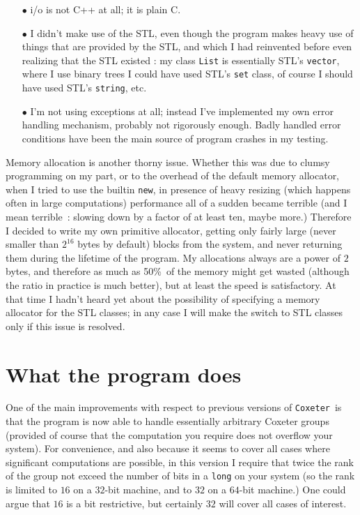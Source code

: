 \documentclass[11pt]{article}
\newcommand{\coxeter}{{\tt Coxeter}}
\begin{document}
\begin{itemize} pt
\item[$\bullet$]i/o is not C++ at all; it is plain C.
\item[$\bullet$]I didn't make use of the STL, even though the program makes
heavy use of things that are provided by the STL, and which I had reinvented
before even realizing that the STL existed : my class {\tt List} is
essentially STL's {\tt vector}, where I use binary trees I could have used
STL's {\tt set} class, of course I should have used STL's {\tt string}, etc.
\item[$\bullet$]I'm not using exceptions at all; instead I've implemented
my own error handling mechanism, probably not rigorously enough. Badly
handled error conditions have been the main source of program crashes in
my testing.
\end{itemize}

\noindent Memory allocation is another thorny issue. Whether this was due to
clumsy programming on my part, or to the overhead of the default memory
allocator, when I tried to use the builtin {\tt new}, in presence of heavy
resizing (which happens often in large computations) performance all of a
sudden became terrible (and I mean terrible~: slowing down by a factor of at
least ten, maybe more.) Therefore I decided to write my own primitive
allocator, getting only fairly large (never smaller than $2^{16}$ bytes by
default) blocks from the system, and never returning them during the lifetime
of the program. My allocations always are a power of $2$ bytes, and therefore
as much as 50\%\ of the memory might get wasted (although the ratio in
practice is much better), but at least the speed is satisfactory. At that
time I hadn't heard yet about the possibility of specifying a memory
allocator for the STL classes; in any case I will make the switch to STL
classes only if this issue is resolved.

\section{What the program does}\label{section:does}

One of the main improvements with respect to previous versions of \coxeter\ is
that the program is now able to handle essentially arbitrary Coxeter groups
(provided of course that the computation you require does not overflow your
system). For convenience, and also because it seems to cover all cases where
significant computations are possible, in this version I require that
twice the rank of the group not exceed the number of bits in a {\tt long}
on your system (so the rank is limited to $16$ on a $32$-bit machine, and
to $32$ on a $64$-bit machine.) One could argue that $16$ is a bit restrictive,
but certainly $32$ will cover all cases of interest.
\end{document}
